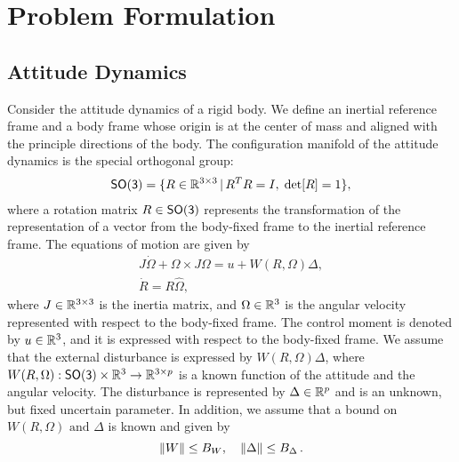 \documentclass[letterpaper, 10 pt, conference]{ieeeconf}  %
\begin{document}


 



 


\section{Problem Formulation}\label{sec:prob_form}
\subsection{Attitude Dynamics}\label{sec:att_dyn}
Consider the attitude dynamics of a rigid body. 
We define an inertial reference frame and a body frame whose origin is at the center of mass and aligned with the principle directions of the body. 
The configuration manifold of the attitude dynamics is the special orthogonal group:
\begin{align*}
	\mathsf{SO(3)} = \{R\in\mathbb{R}^{3\times 3}\,|\, R^TR=I,\;\mathrm{det}[R]=1\} ,
\end{align*}
where a rotation matrix $R\in\mathsf{SO(3)}$ represents the transformation of the representation of a vector from the body-fixed frame to the inertial reference frame. 
The equations of motion are given by
\begin{gather}
	J\dot\Omega + \Omega\times J\Omega = u+W(R,\Omega)\Delta ,\label{eqn:Wdot}\\
	\dot R = R\hat\Omega ,\label{eqn:Rdot}
\end{gather}
where $J\in\mathbb{R}^{3\times 3}$ is the inertia matrix, and $\Omega\in\mathbb{R}^{3}$ is the angular velocity represented with respect to the body-fixed frame. 
The control moment is denoted by $u\in\mathbb{R}^{3}$, and it is expressed with respect to the body-fixed frame. 
We assume that the external disturbance is expressed by $W(R,\Omega)\Delta$, where $W(R,\Omega):\mathsf{SO(3)}\times\mathbb{R}^{3}\rightarrow \mathbb{R}^{3\times p}$ is a known function of the attitude and the angular velocity.
The disturbance is represented by $\Delta\in\mathbb{R}^{p}$ and is an unknown, but fixed uncertain parameter.
In addition, we assume that a bound on \( W(R, \Omega) \text{ and } \Delta \) is known and given by
\begin{equation}
	\left\| W \right\| \leq B_W , \quad \left\| \Delta \right\| \leq B_\Delta \,. \label{eqn:W_bound}
\end{equation}
\end{document}
